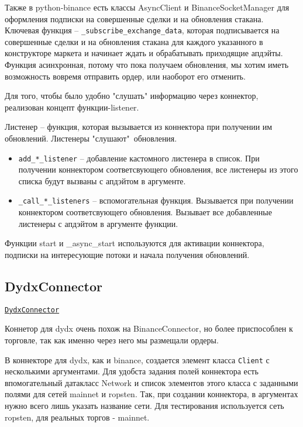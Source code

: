Также в python-binance есть классы AsyncClient и BinanceSocketManager для оформления подписки на совершенные сделки и на обновления стакана. Ключевая функция -- \texttt{\_subscribe\_exchange\_data}, которая подписывается на совершенные сделки и на обновления стакана для каждого указанного в конструкторе маркета и начинает ждать и обрабатывать приходящие апдэйты. Функция асинхронная, потому что пока получаем обновления, мы хотим иметь возможность вовремя отправить ордер, или наоборот его отменить.

Для того, чтобы было удобно "слушать" информацию через коннектор, реализован концепт функции-listener.

\begin{designation}
Листенер -- функция, которая вызывается из коннектора при получении им обновлений. Листенеры "слушают"\ обновления.
\end{designation}

\begin{itemize}
    \item \texttt{add\_*\_listener} -- добавление кастомного листенера в список. При получении коннектором соответсвующего обновления, все листенеры из этого списка будут вызваны с апдэйтом в аргументе.
    \item \texttt{\_call\_*\_listeners} -- вспомогательная функция. Вызывается при получении коннектором соответсвующего обновления. Вызывает все добавленные листенеры с апдэйтом в аргументе функции.
\end{itemize}

Функции start и \_async\_start используются для активации коннектора, подписки на интересующие потоки и начала получения обновлений.

\subsection{DydxConnector}

\href{https://github.com/dexety/dex-trading-system/blob/main/connectors/dydx/connector.py}{\texttt{DydxConnector}}

Коннетор для dydx очень похож на BinanceConnector, но более приспособлен к торговле, так как именно через него мы размещали ордеры.

 В коннекторе для dydx, как и binance, создается элемент класса \texttt{Client} с несколькими аргументами. Для удобста задания полей коннектора есть впомогательный датакласс Network и список элементов этого класса с заданными полями для сетей mainnet и ropsten. Так, при создании коннектора, в аргументах нужно всего лишь указать название сети. Для тестирования используется сеть ropsten, для реальных торгов - mainnet.

